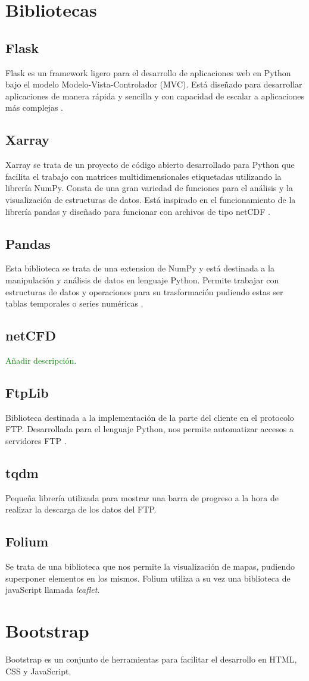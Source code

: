 \section{Bibliotecas}\label{librerias}
	\subsection{Flask}\label{Flask}
Flask es un framework ligero para el desarrollo de aplicaciones web en Python bajo el modelo Modelo-Vista-Controlador (MVC). Está diseñado para desarrollar aplicaciones de manera rápida y sencilla y con capacidad de escalar a aplicaciones más complejas \cite{flask}.
	\subsection{Xarray}\label{xarray}
Xarray se trata de un proyecto de código abierto desarrollado para Python que facilita el trabajo con matrices multidimensionales etiquetadas utilizando la librería NumPy. Consta de una gran variedad de funciones para el análisis y la visualización de estructuras de datos. Está inspirado en el funcionamiento de la librería pandas y diseñado para funcionar con archivos de tipo netCDF \cite{xarray}.	
	\subsection{Pandas}\label{pandas}
Esta biblioteca se trata de una extension de NumPy y está destinada a la manipulación y análisis de datos en lenguaje Python. Permite trabajar con estructuras de datos y operaciones para su trasformación pudiendo estas ser tablas temporales o series numéricas \cite{pandas}.
	\subsection{netCFD}
\textcolor{green}{Añadir descripción.}
	\subsection{FtpLib}\label{FtpLib}
Biblioteca destinada a la implementación de la parte del cliente en el protocolo FTP. Desarrollada para el lenguaje Python, nos permite automatizar accesos a servidores FTP \cite{ftp_lib}.
	\subsection{tqdm}\label{tqdm}
Pequeña librería utilizada para mostrar una barra de progreso a la hora de realizar la descarga de los datos del FTP.
	\subsection{Folium}
Se trata de una biblioteca que nos permite la visualización de mapas, pudiendo superponer elementos en los mismos. Folium utiliza a su vez una biblioteca de javaScript llamada \emph{leaflet}.

	\section{Bootstrap}
Bootstrap es un conjunto de herramientas para facilitar el desarrollo en HTML, CSS y JavaScript.

